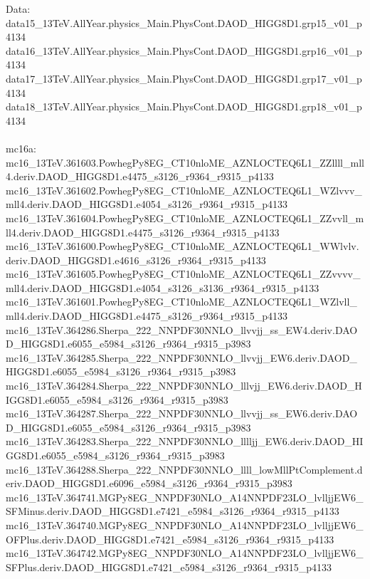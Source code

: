 Data: \\
data15_13TeV.AllYear.physics_Main.PhysCont.DAOD_HIGG8D1.grp15_v01_p4134 \\
data16_13TeV.AllYear.physics_Main.PhysCont.DAOD_HIGG8D1.grp16_v01_p4134 \\
data17_13TeV.AllYear.physics_Main.PhysCont.DAOD_HIGG8D1.grp17_v01_p4134 \\
data18_13TeV.AllYear.physics_Main.PhysCont.DAOD_HIGG8D1.grp18_v01_p4134 \\
 \\
mc16a: \\
mc16_13TeV.361603.PowhegPy8EG_CT10nloME_AZNLOCTEQ6L1_ZZllll_mll4.deriv.DAOD_HIGG8D1.e4475_s3126_r9364_r9315_p4133 \\
mc16_13TeV.361602.PowhegPy8EG_CT10nloME_AZNLOCTEQ6L1_WZlvvv_mll4.deriv.DAOD_HIGG8D1.e4054_s3126_r9364_r9315_p4133 \\
mc16_13TeV.361604.PowhegPy8EG_CT10nloME_AZNLOCTEQ6L1_ZZvvll_mll4.deriv.DAOD_HIGG8D1.e4475_s3126_r9364_r9315_p4133 \\
mc16_13TeV.361600.PowhegPy8EG_CT10nloME_AZNLOCTEQ6L1_WWlvlv.deriv.DAOD_HIGG8D1.e4616_s3126_r9364_r9315_p4133 \\
mc16_13TeV.361605.PowhegPy8EG_CT10nloME_AZNLOCTEQ6L1_ZZvvvv_mll4.deriv.DAOD_HIGG8D1.e4054_s3126_s3136_r9364_r9315_p4133 \\
mc16_13TeV.361601.PowhegPy8EG_CT10nloME_AZNLOCTEQ6L1_WZlvll_mll4.deriv.DAOD_HIGG8D1.e4475_s3126_r9364_r9315_p4133 \\
mc16_13TeV.364286.Sherpa_222_NNPDF30NNLO_llvvjj_ss_EW4.deriv.DAOD_HIGG8D1.e6055_e5984_s3126_r9364_r9315_p3983
mc16_13TeV.364285.Sherpa_222_NNPDF30NNLO_llvvjj_EW6.deriv.DAOD_HIGG8D1.e6055_e5984_s3126_r9364_r9315_p3983
mc16_13TeV.364284.Sherpa_222_NNPDF30NNLO_lllvjj_EW6.deriv.DAOD_HIGG8D1.e6055_e5984_s3126_r9364_r9315_p3983
mc16_13TeV.364287.Sherpa_222_NNPDF30NNLO_llvvjj_ss_EW6.deriv.DAOD_HIGG8D1.e6055_e5984_s3126_r9364_r9315_p3983
mc16_13TeV.364283.Sherpa_222_NNPDF30NNLO_lllljj_EW6.deriv.DAOD_HIGG8D1.e6055_e5984_s3126_r9364_r9315_p3983
mc16_13TeV.364288.Sherpa_222_NNPDF30NNLO_llll_lowMllPtComplement.deriv.DAOD_HIGG8D1.e6096_e5984_s3126_r9364_r9315_p3983
mc16_13TeV.364741.MGPy8EG_NNPDF30NLO_A14NNPDF23LO_lvlljjEW6_SFMinus.deriv.DAOD_HIGG8D1.e7421_e5984_s3126_r9364_r9315_p4133 \\
mc16_13TeV.364740.MGPy8EG_NNPDF30NLO_A14NNPDF23LO_lvlljjEW6_OFPlus.deriv.DAOD_HIGG8D1.e7421_e5984_s3126_r9364_r9315_p4133 \\
mc16_13TeV.364742.MGPy8EG_NNPDF30NLO_A14NNPDF23LO_lvlljjEW6_SFPlus.deriv.DAOD_HIGG8D1.e7421_e5984_s3126_r9364_r9315_p4133 \\
